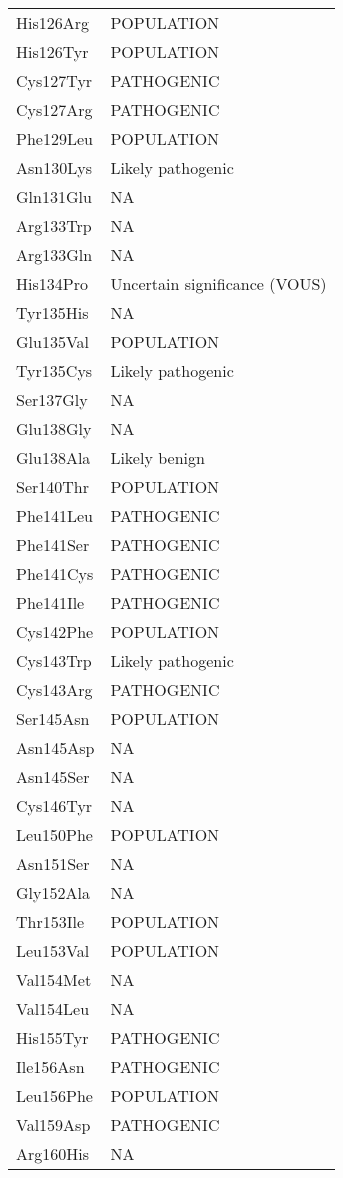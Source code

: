\begin{tiny}
\begin{longtable}[l]{l|l}
	His126Arg & POPULATION \\
	His126Tyr & POPULATION \\
	Cys127Tyr & PATHOGENIC \\
	Cys127Arg & PATHOGENIC \\
	Phe129Leu & POPULATION \\
	Asn130Lys & Likely pathogenic \\
	Gln131Glu & NA \\
	Arg133Trp & NA \\
	Arg133Gln & NA \\
	His134Pro & Uncertain significance (VOUS) \\
	Tyr135His & NA \\
	Glu135Val & POPULATION \\
	Tyr135Cys & Likely pathogenic \\
	Ser137Gly & NA \\
	Glu138Gly & NA \\
	Glu138Ala & Likely benign \\
	Ser140Thr & POPULATION \\
	Phe141Leu & PATHOGENIC \\
	Phe141Ser & PATHOGENIC \\
	Phe141Cys & PATHOGENIC \\
	Phe141Ile & PATHOGENIC \\
	Cys142Phe & POPULATION \\
	Cys143Trp & Likely pathogenic \\
	Cys143Arg & PATHOGENIC \\
	Ser145Asn & POPULATION \\
	Asn145Asp & NA \\
	Asn145Ser & NA \\
	Cys146Tyr & NA \\
	Leu150Phe & POPULATION \\
	Asn151Ser & NA \\
	Gly152Ala & NA \\
	Thr153Ile & POPULATION \\
	Leu153Val & POPULATION \\
	Val154Met & NA \\
	Val154Leu & NA \\
	His155Tyr & PATHOGENIC \\
	Ile156Asn & PATHOGENIC \\
	Leu156Phe & POPULATION \\
	Val159Asp & PATHOGENIC \\
	Arg160His & NA \\

\end{longtable}
\end{tiny}
